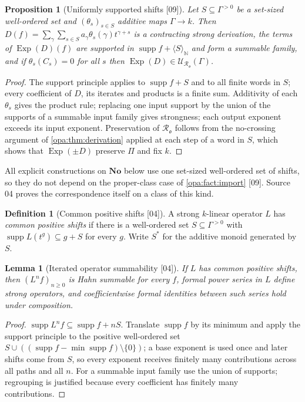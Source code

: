 \documentclass[11pt,oneside]{article}
\numberwithin{equation}{section}
\newtheorem{proposition}[proposition]{Proposition}
\newtheorem{lemma}[lemma]{Lemma}
\theoremstyle{definition}
\newtheorem{definition}[definition]{Definition}
\theoremstyle{remark}
\newcommand{\No}{\mathbf{No}}
\newcommand{\N}{\mathbb N}
\newcommand{\oo}{\mathfrak o}
\newcommand{\Ro}{\mathcal R_{\oo}}
\newcommand{\UU}{\mathcal U}
\newcommand{\supp}{\operatorname{supp}}
\newcommand{\Exp}{\operatorname{Exp}}
\newcommand{\src}[1]{\textup{\textsf{\small[#1]}}}
\begin{document}
\begin{proposition}[Uniformly supported shifts \src{09}]\label{opa:prop:uniform}
Let $S\subseteq\Gamma^{>0}$ be a set-sized well-ordered set and
$(\theta_s)_{s\in S}$ additive maps $\Gamma\to k$. Then
$D(f)=\sum_{\gamma}\sum_{s\in S}a_\gamma\theta_s(\gamma)t^{\gamma+s}$ is a contracting
strong derivation, the terms of $\Exp(D)(f)$ are supported in
$\supp f+\langle S\rangle_\N$ and form a summable family, and if
$\theta_s(C_s)=0$ for all $s$ then $\Exp(D)\in\UU_{\Ro}(\Gamma)$.
\end{proposition}
\begin{proof}
The support principle applies to $\supp f+S$ and to all finite words in $S$;
every coefficient of $D$, its iterates and products is a finite sum.
Additivity of each $\theta_s$ gives the product rule; replacing one input
support by the union of the supports of a summable input family gives
strongness; each output exponent exceeds its input exponent. Preservation of
$\Ro$ follows from the no-crossing argument of \cref{opa:thm:derivation}
applied at each step of a word in $S$, which shows that $\Exp(\pm D)$ preserve
$\Pi$ and fix $k$.
\end{proof}

All explicit constructions on $\No$ below use one set-sized well-ordered set
of shifts, so they do not depend on the proper-class case of
\cref{opa:fact:import} \src{09}. Source 04 proves the correspondence itself on
a class of this kind.

\begin{definition}[Common positive shifts \src{04}]\label{opa:def:common}
A strong $k$-linear operator $L$ has \emph{common positive shifts} if there is
a well-ordered set $S\subseteq\Gamma^{>0}$ with $\supp L(t^g)\subseteq g+S$ for
every $g$. Write $S^*$ for the additive monoid generated by $S$.
\end{definition}

\begin{lemma}[Iterated operator summability \src{04}]\label{opa:lem:operator}
If $L$ has common positive shifts, then $(L^nf)_{n\ge0}$ is Hahn summable for
every $f$, formal power series in $L$ define strong operators, and
coefficientwise formal identities between such series hold under composition.
\end{lemma}
\begin{proof}
$\supp L^nf\subseteq\supp f+nS$. Translate $\supp f$ by its minimum and apply the
support principle to the positive well-ordered set $S\cup((\supp f-\min\supp
f)\setminus\{0\})$; a base exponent is used once and later shifts come from
$S$, so every exponent receives finitely many contributions across all paths
and all $n$. For a summable input family use the union of supports; regrouping
is justified because every coefficient has finitely many contributions.
\end{proof}
\end{document}
